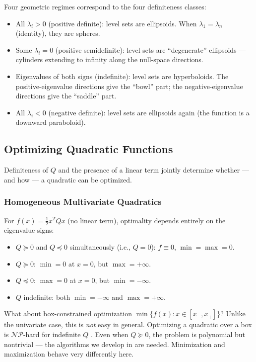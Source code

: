 Four geometric regimes correspond to the four definiteness classes:
\begin{itemize}
	\item All $\lambda_i > 0$ (positive definite): level sets are ellipsoids.
		When $\lambda_1 = \lambda_n$ (identity), they are spheres.
	\item Some $\lambda_i = 0$ (positive semidefinite): level sets are ``degenerate'' ellipsoids --- cylinders extending to infinity along the null-space directions.
	\item Eigenvalues of both signs (indefinite): level sets are hyperboloids.
		The positive-eigenvalue directions give the ``bowl'' part; the negative-eigenvalue directions give the ``saddle'' part.
	\item All $\lambda_i < 0$ (negative definite): level sets are ellipsoids again (the function is a downward paraboloid).
\end{itemize}


\subsection{Optimizing Quadratic Functions}\label{ssec:opt-quad}

Definiteness of $Q$ and the presence of a linear term jointly determine whether --- and how --- a quadratic can be optimized.

\subsubsection{Homogeneous Multivariate Quadratics}\label{sssec:opt-quad-hom}

For $f(x) = \frac{1}{2} x^T Q x$ (no linear term), optimality depends entirely on the eigenvalue signs:
\begin{itemize}
	\item $Q \succeq 0$ and $Q \preceq 0$ simultaneously (i.e., $Q = 0$): $f \equiv 0$, $\min = \max = 0$.
	\item $Q \succeq 0$: $\min = 0$ at $x = 0$, but $\max = +\infty$.
	\item $Q \preceq 0$: $\max = 0$ at $x = 0$, but $\min = -\infty$.
	\item $Q$ indefinite: both $\min = -\infty$ and $\max = +\infty$.
\end{itemize}

What about box-constrained optimization $\min\{f(x) : x \in [x_-, x_+]\}$?
Unlike the univariate case, this is \emph{not} easy in general.
Optimizing a quadratic over a box is $\mathcal{NP}$-hard for indefinite $Q$ \cite{deklerk2008}.
Even when $Q \succeq 0$, the problem is polynomial but nontrivial --- the algorithms we develop in  are needed.
Minimization and maximization behave very differently here.

